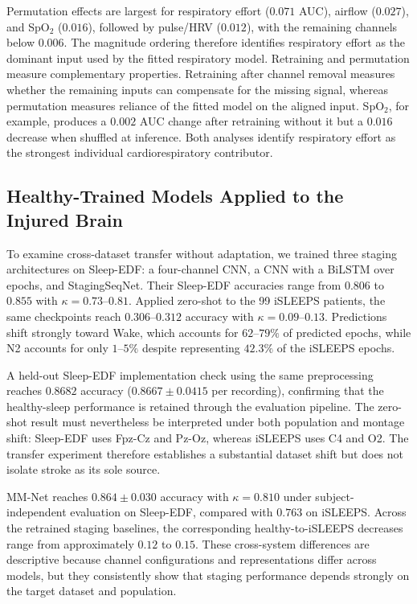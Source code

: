 \documentclass[a4paper,fleqn]{cas-sc}
\newcommand{\mmAcc}{0.763}
\begin{document}
Permutation effects are largest for respiratory effort ($0.071$ AUC), airflow ($0.027$), and SpO$_2$ ($0.016$), followed by pulse/HRV ($0.012$), with the remaining channels below $0.006$. The magnitude ordering therefore identifies respiratory effort as the dominant input used by the fitted respiratory model. Retraining and permutation measure complementary properties. Retraining after channel removal measures whether the remaining inputs can compensate for the missing signal, whereas permutation measures reliance of the fitted model on the aligned input. SpO$_2$, for example, produces a $0.002$ AUC change after retraining without it but a $0.016$ decrease when shuffled at inference. Both analyses identify respiratory effort as the strongest individual
cardiorespiratory contributor.

\subsection{Healthy-Trained Models Applied to the Injured Brain}
\label{sec:domaingap}
To examine cross-dataset transfer without adaptation, we trained three staging
architectures on Sleep-EDF: a four-channel CNN, a CNN with a BiLSTM over epochs,
and StagingSeqNet. Their Sleep-EDF accuracies range from $0.806$ to $0.855$ with
$\kappa=0.73$--$0.81$. Applied zero-shot to the 99 iSLEEPS patients, the same
checkpoints reach $0.306$--$0.312$ accuracy with $\kappa=0.09$--$0.13$.
Predictions shift strongly toward Wake, which accounts for $62$--$79\%$ of
predicted epochs, while N2 accounts for only $1$--$5\%$ despite representing
$42.3\%$ of the iSLEEPS epochs.

A held-out Sleep-EDF implementation check using the same preprocessing reaches
$0.8682$ accuracy ($0.8667 \pm 0.0415$ per recording), confirming that the
healthy-sleep performance is retained through the evaluation pipeline. The
zero-shot result must nevertheless be interpreted under both population and
montage shift: Sleep-EDF uses Fpz-Cz and Pz-Oz, whereas iSLEEPS uses C4 and O2.
The transfer experiment therefore establishes a substantial dataset shift but
does not isolate stroke as its sole source.

MM-Net reaches $0.864 \pm 0.030$ accuracy with $\kappa=0.810$ under
subject-independent evaluation on Sleep-EDF, compared with $\mmAcc$ on iSLEEPS. Across the retrained staging baselines, the corresponding
healthy-to-iSLEEPS decreases range from approximately $0.12$ to $0.15$.
These cross-system differences are descriptive because channel configurations
and representations differ across models, but they consistently show that
staging performance depends strongly on the target dataset and population.
\end{document}
